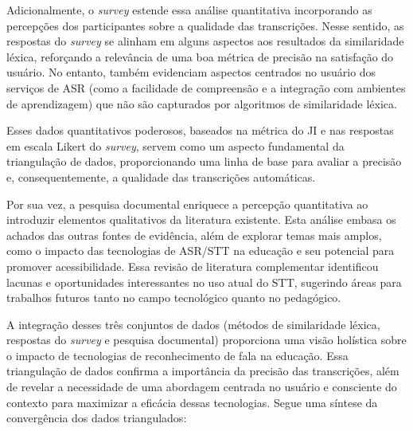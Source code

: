 Adicionalmente, o \textit{survey} estende essa análise quantitativa incorporando as percepções dos participantes sobre a qualidade das transcrições. Nesse sentido, as respostas do \textit{survey} se alinham em alguns aspectos aos resultados da similaridade léxica, reforçando a relevância de uma boa métrica de precisão na satisfação do usuário. No entanto, também evidenciam aspectos centrados no usuário dos serviços de ASR (como a facilidade de compreensão e a integração com ambientes de aprendizagem) que não são capturados por algoritmos de similaridade léxica.

Esses dados quantitativos poderosos, baseados na métrica do JI e nas respostas em escala Likert do \textit{survey}, servem como um aspecto fundamental da triangulação de dados, proporcionando uma linha de base para avaliar a precisão e, consequentemente, a qualidade das transcrições automáticas.

Por sua vez, a pesquisa documental enriquece a percepção quantitativa ao introduzir elementos qualitativos da literatura existente. Esta análise embasa os achados das outras fontes de evidência, além de explorar temas mais amplos, como o impacto das tecnologias de ASR/STT na educação e seu potencial para promover acessibilidade. Essa revisão de literatura complementar identificou lacunas e oportunidades interessantes no uso atual do STT, sugerindo áreas para trabalhos futuros tanto no campo tecnológico quanto no pedagógico.

A integração desses três conjuntos de dados (métodos de similaridade léxica, respostas do \textit{survey} e pesquisa documental) proporciona uma visão holística sobre o impacto de tecnologias de reconhecimento de fala na educação. Essa triangulação de dados confirma a importância da precisão das transcrições, além de revelar a necessidade de uma abordagem centrada no usuário e consciente do contexto para maximizar a eficácia dessas tecnologias. Segue uma síntese da convergência dos dados triangulados:

